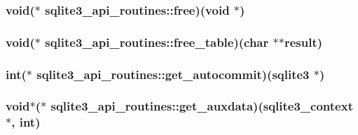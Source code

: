 \hypertarget{structsqlite3__api__routines_a5778783c18a96cff28a516168db77ae9}{
\subsubsection[{free}]{\setlength{\rightskip}{0pt plus 5cm}void($\ast$ sqlite3\-\_\-api\-\_\-routines\-::free)(void $\ast$)}}\label{structsqlite3__api__routines_a5778783c18a96cff28a516168db77ae9}
\hypertarget{structsqlite3__api__routines_a16d39862f10f54f34e2d52b4da51fdac}{
\subsubsection[{free\-\_\-table}]{\setlength{\rightskip}{0pt plus 5cm}void($\ast$ sqlite3\-\_\-api\-\_\-routines\-::free\-\_\-table)(char $\ast$$\ast$result)}}\label{structsqlite3__api__routines_a16d39862f10f54f34e2d52b4da51fdac}
\hypertarget{structsqlite3__api__routines_a8724984acc7ccfefaa17f04a739fc396}{
\subsubsection[{get\-\_\-autocommit}]{\setlength{\rightskip}{0pt plus 5cm}int($\ast$ sqlite3\-\_\-api\-\_\-routines\-::get\-\_\-autocommit)({\bf sqlite3} $\ast$)}}\label{structsqlite3__api__routines_a8724984acc7ccfefaa17f04a739fc396}
\hypertarget{structsqlite3__api__routines_af5e805a1a5e4bcdfe26489a448a571a9}{
\subsubsection[{get\-\_\-auxdata}]{\setlength{\rightskip}{0pt plus 5cm}void$\ast$($\ast$ sqlite3\-\_\-api\-\_\-routines\-::get\-\_\-auxdata)({\bf sqlite3\-\_\-context} $\ast$, int)}}\label{structsqlite3__api__routines_af5e805a1a5e4bcdfe26489a448a571a9}
